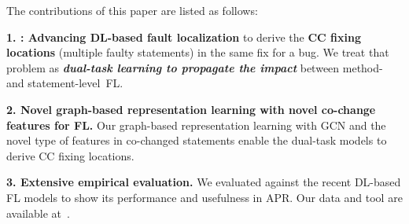 
The contributions of this paper are listed as follows:

{\bf 1. {\tool}: Advancing DL-based fault localization} to derive the
{\bf CC fixing locations} (multiple faulty statements) in the same fix
for a bug. We treat that problem as {\bf {\em dual-task learning to
    propagate the impact}} between method- and statement-level~FL.


{\bf 2. Novel graph-based representation learning with novel co-change
  features for FL.} Our graph-based representation learning with GCN
and the novel type of features in co-changed statements enable the
dual-task models to derive CC fixing locations.

{\bf 3. Extensive empirical evaluation.} We evaluated {\tool} against
the recent DL-based FL models to show its performance and
usefulness in APR. Our data and tool are available
at~\cite{FixLocator2022}.


